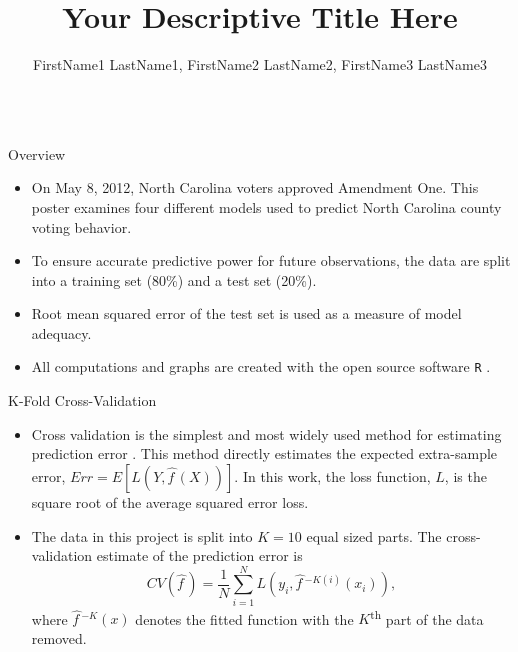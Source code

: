 \documentclass[final]{beamer}\usepackage[]{graphicx}\usepackage[]{color}
\title{Your Descriptive Title Here}
\author{FirstName1 LastName1, FirstName2 LastName2, FirstName3 LastName3}
\institute{Department of Mathematical Sciences}
\begin{document}
\begin{frame}[fragile]
\vspace{-2ex}
\begin{columns}[t]





\begin{column}{0.23\linewidth}
\begin{minipage}[t][.955\textheight]{\linewidth} 

\vspace{0ex}
\begin{block}{Overview}
\begin{itemize}
\item On May 8, 2012, North Carolina voters approved Amendment One.  This poster examines four different models used to predict North Carolina county voting behavior.  
\item To ensure accurate predictive power for future observations, the data are split into a training set (80\%) and a test set (20\%). 
\item Root mean squared error of the test set is used as a measure of model adequacy.  
\item All computations and graphs are created with the open source software \texttt{R} \cite{R-base}. 
\end{itemize}
\vspace{0ex}
\end{block}
\vfill

\begin{block}{K-Fold Cross-Validation}
\begin{itemize}
\item Cross validation is the simplest and most widely used method for estimating prediction error \cite{JF09}.  This method directly estimates the expected extra-sample error, $Err = E[{L(Y, \hat{f\,}\!(X))}]$.  In this work, the loss function, $L$, is the square root of the average squared error loss.
\vspace{2ex}
\item The data in this project is split into $K=10$ equal sized parts.  The cross-validation estimate of the prediction error is $$CV(\hat{f\,}\!)=\frac{1}{N}\sum_{i=1}^{N}L(y_i, \hat{f\,}\!^{-K(i)}(x_i)),$$
where $\hat{f\,}\!^{-K}(x)$ denotes the fitted function with the $K$\textsuperscript{th} part of the data removed.
\end{itemize}
\vspace{0ex}
\vfill
\end{block}
\vfill


\end{minipage}
\end{column}
\end{columns}
\end{frame}
\end{document}
